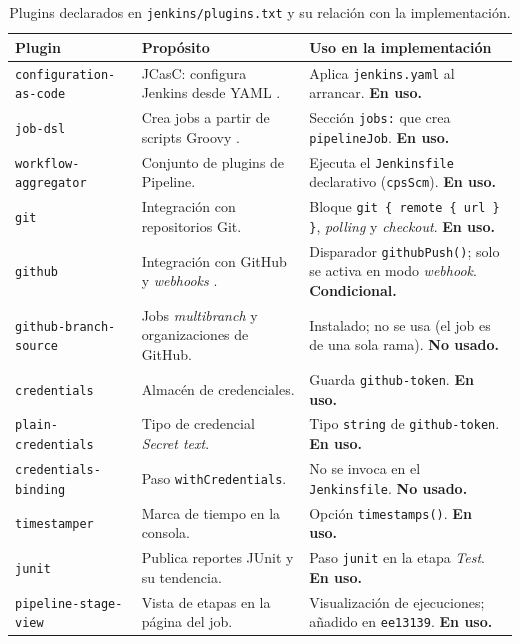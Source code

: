 \documentclass[11pt,a4paper]{article}
\begin{document}
\begin{table}[H]
\centering
\small
\begin{tabularx}{\textwidth}{@{}l L L@{}}
\toprule
\textbf{Plugin} & \textbf{Propósito} & \textbf{Uso en la implementación}\\
\midrule
\texttt{configuration-as-code} & JCasC: configura Jenkins desde YAML \cite{jenkins-jcasc}. & Aplica
\texttt{jenkins.yaml} al arrancar. \textbf{En uso.}\\
\texttt{job-dsl} & Crea jobs a partir de scripts Groovy \cite{jenkins-jobdsl}. & Sección
\texttt{jobs:} que crea \texttt{pipelineJob}. \textbf{En uso.}\\
\texttt{workflow-aggregator} & Conjunto de plugins de Pipeline. & Ejecuta el \texttt{Jenkinsfile}
declarativo (\texttt{cpsScm}). \textbf{En uso.}\\
\texttt{git} & Integración con repositorios Git. & Bloque \texttt{git \{ remote \{ url \} \}},
\emph{polling} y \emph{checkout}. \textbf{En uso.}\\
\texttt{github} & Integración con GitHub y \emph{webhooks} \cite{jenkins-github}. & Disparador
\texttt{githubPush()}; solo se activa en modo \emph{webhook}. \textbf{Condicional.}\\
\texttt{github-branch-source} & Jobs \emph{multibranch} y organizaciones de GitHub. & Instalado; no
se usa (el job es de una sola rama). \textbf{No usado.}\\
\texttt{credentials} & Almacén de credenciales. & Guarda \texttt{github-token}. \textbf{En uso.}\\
\texttt{plain-credentials} & Tipo de credencial \emph{Secret text}. & Tipo \texttt{string} de
\texttt{github-token}. \textbf{En uso.}\\
\texttt{credentials-binding} & Paso \texttt{withCredentials}. & No se invoca en el
\texttt{Jenkinsfile}. \textbf{No usado.}\\
\texttt{timestamper} & Marca de tiempo en la consola. & Opción \texttt{timestamps()}. \textbf{En uso.}\\
\texttt{junit} & Publica reportes JUnit y su tendencia. & Paso \texttt{junit} en la etapa
\emph{Test}. \textbf{En uso.}\\
\texttt{pipeline-stage-view} & Vista de etapas en la página del job. & Visualización de
ejecuciones; añadido en \texttt{ee13139}. \textbf{En uso.}\\
\bottomrule
\end{tabularx}
\caption{Plugins declarados en \texttt{jenkins/plugins.txt} y su relación con la implementación.}
\label{tab:plugins}
\end{table}
\end{document}
